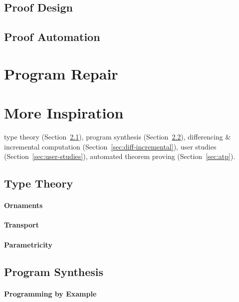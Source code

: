 \subsection{Proof Design}
\label{sec:design}

\subsection{Proof Automation}
\label{sec:automation}

\section{Program Repair}
\label{sec:repair}

\section{More Inspiration}
\label{sec:inspiration}

type theory (Section~\ref{sec:typetheory}),
program synthesis (Section~\ref{sec:synthesis}),
differencing \& incremental computation (Section~\ref{sec:diff-incremental}),
user studies (Section~\ref{sec:user-studies}),
automated theorem proving (Section~\ref{sec:atp}).

\subsection{Type Theory}
\label{sec:typetheory}

\paragraph{Ornaments}

\paragraph{Transport}

\paragraph{Parametricity}

\subsection{Program Synthesis}
\label{sec:synthesis}

\paragraph{Programming by Example}

